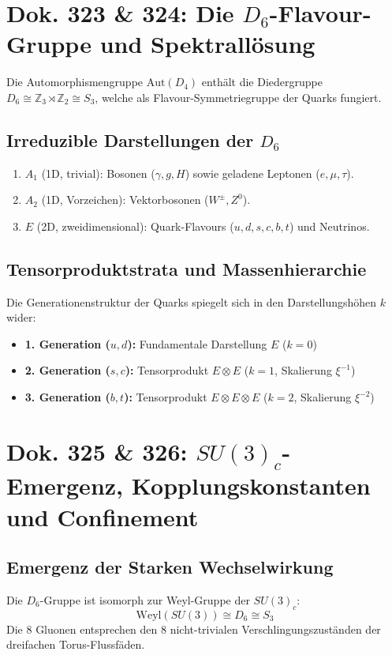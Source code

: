 \documentclass[11pt,a4paper]{article}
\begin{document}
	\section{Dok. 323 \& 324: Die $D_6$-Flavour-Gruppe und Spektrallösung}
	
	Die Automorphismengruppe $\text{Aut}(D_4)$ enthält die Diedergruppe $D_6 \cong \mathbb{Z}_3 \rtimes \mathbb{Z}_2 \cong S_3$, welche als Flavour-Symmetriegruppe der Quarks fungiert.
	
	\subsection{Irreduzible Darstellungen der $D_6$}
	\begin{enumerate}
		\item $A_1$ (1D, trivial): Bosonen ($\gamma, g, H$) sowie geladene Leptonen ($e, \mu, \tau$).
		\item $A_2$ (1D, Vorzeichen): Vektorbosonen ($W^\pm, Z^0$).
		\item $E$ (2D, zweidimensional): Quark-Flavours ($u, d, s, c, b, t$) und Neutrinos.
	\end{enumerate}
	
	\subsection{Tensorproduktstrata und Massenhierarchie}
	Die Generationenstruktur der Quarks spiegelt sich in den Darstellungshöhen $k$ wider:
	\begin{itemize}
		\item \textbf{1. Generation ($u, d$):} Fundamentale Darstellung $E$ ($k=0$)
		\item \textbf{2. Generation ($s, c$):} Tensorprodukt $E \otimes E$ ($k=1$, Skalierung $\xi^{-1}$)
		\item \textbf{3. Generation ($b, t$):} Tensorprodukt $E \otimes E \otimes E$ ($k=2$, Skalierung $\xi^{-2}$)
	\end{itemize}
	
	\section{Dok. 325 \& 326: $SU(3)_c$-Emergenz, Kopplungskonstanten und Confinement}
	
	\subsection{Emergenz der Starken Wechselwirkung}
	Die $D_6$-Gruppe ist isomorph zur Weyl-Gruppe der $SU(3)_c$:
	\begin{equation}
		\text{Weyl}(SU(3)) \cong D_6 \cong S_3
	\end{equation}
	Die 8 Gluonen entsprechen den 8 nicht-trivialen Verschlingungszuständen der dreifachen Torus-Flussfäden.
	
\end{document}
